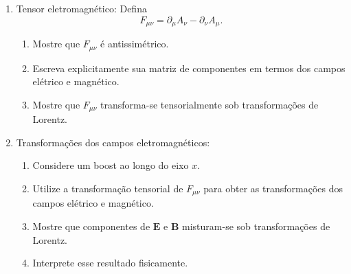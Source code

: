 \begin{enumerate}
            \begin{enumerate}
                  \item Mostre que $A^\mu$ transforma-se como um quadrivetor.

                  \item Identifique suas componentes temporal e espaciais.

                  \item Discuta a liberdade de calibre.
            \end{enumerate}

      \item Tensor eletromagnético: Defina
            $$
                  F_{\mu\nu}
                  =
                  \partial_\mu A_\nu
                  -
                  \partial_\nu A_\mu.
            $$

            \begin{enumerate}
                  \item Mostre que $F_{\mu\nu}$ é antissimétrico.

                  \item Escreva explicitamente sua matriz de componentes em termos dos
                        campos elétrico e magnético.

                  \item Mostre que $F_{\mu\nu}$ transforma-se tensorialmente sob
                        transformações de Lorentz.
            \end{enumerate}

      \item Transformações dos campos eletromagnéticos:

            \begin{enumerate}
                  \item Considere um boost ao longo do eixo $x$.

                  \item Utilize a transformação tensorial de $F_{\mu\nu}$ para obter
                        as transformações dos campos elétrico e magnético.

                  \item Mostre que componentes de $\mathbf E$ e $\mathbf B$
                        misturam-se sob transformações de Lorentz.

                  \item Interprete esse resultado fisicamente.
            \end{enumerate}


\end{enumerate}

